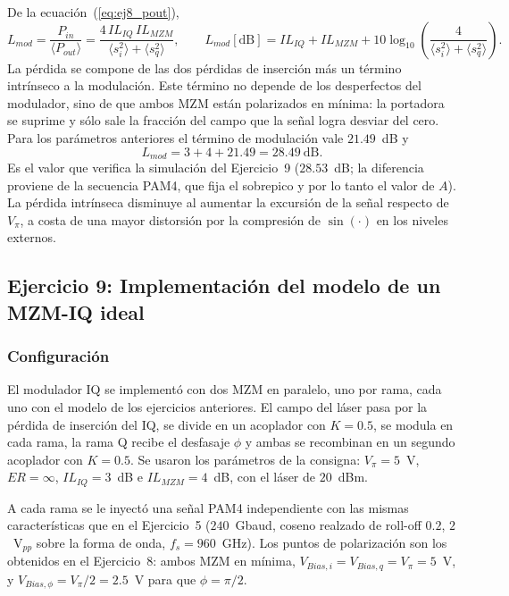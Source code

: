 De la ecuación~(\ref{eq:ej8_pout}),
%
\begin{equation}
L_{mod} = \frac{P_{in}}{\langle P_{out}\rangle}
= \frac{4\,IL_{IQ}\,IL_{MZM}}{\langle s_i^2\rangle + \langle s_q^2\rangle},
\qquad
L_{mod}[\text{dB}] = IL_{IQ} + IL_{MZM}
+ 10\log_{10}\!\left(\frac{4}{\langle s_i^2\rangle + \langle s_q^2\rangle}\right).
\end{equation}
%
La pérdida se compone de las dos pérdidas de inserción más un término
intrínseco a la modulación. Este término no depende de los desperfectos
del modulador, sino de que ambos MZM están polarizados en mínima: la
portadora se suprime y sólo sale la fracción del campo que la señal logra
desviar del cero. Para los parámetros anteriores el término de modulación
vale $21.49$~dB y
%
\begin{equation}
L_{mod} = 3 + 4 + 21.49 = 28.49~\text{dB}.
\end{equation}
%
Es el valor que verifica la simulación del Ejercicio~9 ($28.53$~dB; la
diferencia proviene de la secuencia PAM4, que fija el sobrepico y por lo
tanto el valor de $A$). La pérdida intrínseca disminuye al aumentar la
excursión de la señal respecto de $V_\pi$, a costa de una mayor
distorsión por la compresión de $\sin(\cdot)$ en los niveles externos.

\subsection*{Ejercicio 9: Implementación del modelo de un MZM-IQ ideal}

\subsubsection*{Configuración}

El modulador IQ se implementó con dos MZM en paralelo, uno por rama, cada
uno con el modelo de los ejercicios anteriores. El campo del láser pasa por
la pérdida de inserción del IQ, se divide en un acoplador con $K = 0.5$, se
modula en cada rama, la rama Q recibe el desfasaje $\phi$ y ambas se
recombinan en un segundo acoplador con $K = 0.5$. Se usaron los parámetros
de la consigna: $V_\pi = 5$~V, $ER = \infty$, $IL_{IQ} = 3$~dB e
$IL_{MZM} = 4$~dB, con el láser de $20$~dBm.

A cada rama se le inyectó una señal PAM4 independiente con las mismas
características que en el Ejercicio~5 ($240$~Gbaud, coseno realzado de
roll-off $0.2$, $2$~V$_{pp}$ sobre la forma de onda, $f_s = 960$~GHz). Los
puntos de polarización son los obtenidos en el Ejercicio~8: ambos MZM en
mínima, $V_{Bias,i} = V_{Bias,q} = V_\pi = 5$~V, y
$V_{Bias,\phi} = V_\pi/2 = 2.5$~V para que $\phi = \pi/2$.

